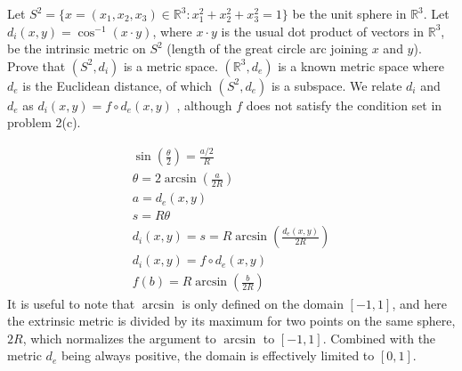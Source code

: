 \documentclass{jhwhw}
\begin{document}
\problem{}%
Let $S^2 = \{x = (x_1,x_2,x_3)\in\mathbb{R}^3 : x_1^2 + x_2^2 + x_3^2  = 1\}$ be the unit sphere  in $\mathbb{R}^3$.  Let $d_i(x,y) = \cos^{-1}(x\cdot y)$, where $x\cdot y$ is the usual dot product of vectors in $\mathbb{R}^3$, be the intrinsic metric on $S^2$ (length of the great circle arc joining $x$ and $y$).    Prove that $(S^2,d_i)$ is a metric space.
\solution
$(\mathbb{R}^3,d_e)$ is a known metric space where $d_e$ is the Euclidean distance, of which $(S^2,d_e)$ is a subspace. We relate $d_i$ and $d_e$ as $d_i (x,y)= f\circ d_e(x,y)$ , although $f$ does not satisfy the condition set in problem 2(c).
\begin{center}
\end{center}
\begin{gather}
\sin\left(\frac{\theta}{2}\right)=\frac{a/2}{R}\\
\theta = 2 \arcsin\left(\frac{a}{2R}\right)\\
a= d_e(x,y)\\
s= R\theta\\
d_i(x,y) = s = R \arcsin\left(\frac{d_e(x,y)}{2R}\right)\\
d_i(x,y) = f\circ d_e(x,y)\\
f(b) = R\arcsin\left(\frac{b}{2R}\right)
\end{gather}
It is useful to note that $\arcsin$ is only defined on the domain $[-1,1]$, and here the extrinsic metric is divided by its maximum for two points on the same sphere, $2R$, which normalizes the argument to $\arcsin$ to $[-1,1]$. Combined with the metric $d_e$ being always positive, the domain is effectively limited to $[0,1]$.
\end{document}

